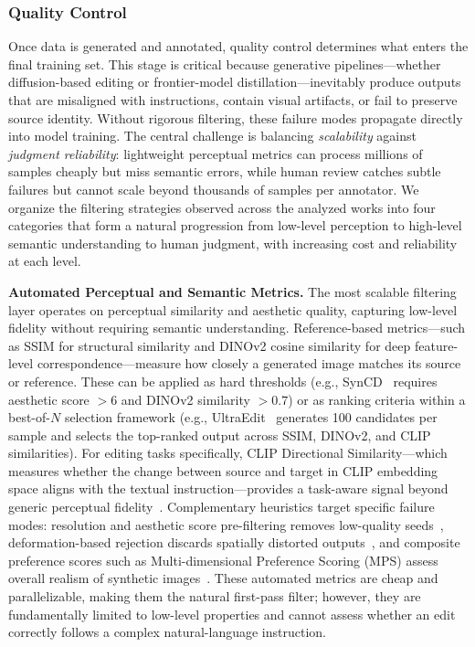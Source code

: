 \subsubsection{Quality Control}
\label{sec:quality}

Once data is generated and annotated, quality control determines what enters the final training set. This stage is critical because generative pipelines---whether diffusion-based editing or frontier-model distillation---inevitably produce outputs that are misaligned with instructions, contain visual artifacts, or fail to preserve source identity. Without rigorous filtering, these failure modes propagate directly into model training. The central challenge is balancing \emph{scalability} against \emph{judgment reliability}: lightweight perceptual metrics can process millions of samples cheaply but miss semantic errors, while human review catches subtle failures but cannot scale beyond thousands of samples per annotator. We organize the filtering strategies observed across the analyzed works into four categories that form a natural progression from low-level perception to high-level semantic understanding to human judgment, with increasing cost and reliability at each level.

\textbf{Automated Perceptual and Semantic Metrics.}
The most scalable filtering layer operates on perceptual similarity and aesthetic quality, capturing low-level fidelity without requiring semantic understanding. Reference-based metrics---such as SSIM for structural similarity and DINOv2 cosine similarity for deep feature-level correspondence---measure how closely a generated image matches its source or reference. These can be applied as hard thresholds (e.g., SynCD~\citep{kumari2025generating} requires aesthetic score ${>}6$ and DINOv2 similarity ${>}0.7$) or as ranking criteria within a best-of-$N$ selection framework (e.g., UltraEdit~\citep{zhao2024ultraedit} generates 100 candidates per sample and selects the top-ranked output across SSIM, DINOv2, and CLIP similarities). For editing tasks specifically, CLIP Directional Similarity---which measures whether the change between source and target in CLIP embedding space aligns with the textual instruction---provides a task-aware signal beyond generic perceptual fidelity~\citep{zhao2024ultraedit}. Complementary heuristics target specific failure modes: resolution and aesthetic score pre-filtering removes low-quality seeds~\citep{ye2025imgedit}, deformation-based rejection discards spatially distorted outputs~\citep{hui2024hq}, and composite preference scores such as Multi-dimensional Preference Scoring (MPS) assess overall realism of synthetic images~\citep{bertazzini2025dragon}. These automated metrics are cheap and parallelizable, making them the natural first-pass filter; however, they are fundamentally limited to low-level properties and cannot assess whether an edit correctly follows a complex natural-language instruction.

